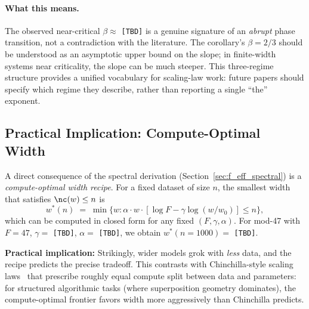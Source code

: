 \paragraph{What this means.}
The observed near-critical $\beta \approx $ \texttt{[TBD]} is a genuine signature of an \emph{abrupt} phase transition, not a contradiction with the literature.
The corollary's $\beta = 2/3$ should be understood as an asymptotic upper bound on the slope; in finite-width systems near criticality, the slope can be much steeper.
This three-regime structure provides a unified vocabulary for scaling-law work: future papers should specify which regime they describe, rather than reporting a single ``the'' exponent.

\subsection{Practical Implication: Compute-Optimal Width}
\label{sec:compute_optimal}

A direct consequence of the spectral derivation (Section~\ref{sec:f_eff_spectral}) is a \emph{compute-optimal width recipe}.
For a fixed dataset of size $n$, the smallest width that satisfies $\nc(w) \leq n$ is
\begin{equation}
\label{eq:w_min}
w^*(n) \;=\; \min\big\{ w : \alpha \cdot w \cdot [\log F - \gamma \log(w/w_0)] \leq n \big\},
\end{equation}
which can be computed in closed form for any fixed $(F, \gamma, \alpha)$.
For mod-47 with $F=47$, $\gamma = $ \texttt{[TBD]}, $\alpha = $ \texttt{[TBD]}, we obtain $w^*(n=1000) = $ \texttt{[TBD]}.

\textbf{Practical implication:} Strikingly, wider models grok with \emph{less} data, and the recipe predicts the precise tradeoff.
This contrasts with Chinchilla-style scaling laws~\citep{hoffmann2022training} that prescribe roughly equal compute split between data and parameters: for structured algorithmic tasks (where superposition geometry dominates), the compute-optimal frontier favors width more aggressively than Chinchilla predicts.




